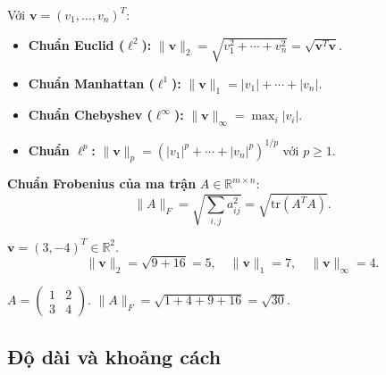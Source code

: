 \documentclass[12pt,a4paper]{article}
\begin{document}
\begin{congthuc}[title={Các chuẩn thông dụng trên $\mathbb{R}^n$}]
Với $\mathbf{v} = (v_1, \ldots, v_n)^T$:
\begin{itemize}
  \item \textbf{Chuẩn Euclid ($\ell^2$):} $\|\mathbf{v}\|_2 = \sqrt{v_1^2 + \cdots + v_n^2} = \sqrt{\mathbf{v}^T\mathbf{v}}$.
  \item \textbf{Chuẩn Manhattan ($\ell^1$):} $\|\mathbf{v}\|_1 = |v_1| + \cdots + |v_n|$.
  \item \textbf{Chuẩn Chebyshev ($\ell^\infty$):} $\|\mathbf{v}\|_\infty = \max_i |v_i|$.
  \item \textbf{Chuẩn $\ell^p$:} $\|\mathbf{v}\|_p = (|v_1|^p + \cdots + |v_n|^p)^{1/p}$ với $p \ge 1$.
\end{itemize}

\textbf{Chuẩn Frobenius của ma trận} $A \in \mathbb{R}^{m\times n}$:
\[
  \|A\|_F = \sqrt{\sum_{i,j} a_{ij}^2} = \sqrt{\mathrm{tr}(A^T A)}.
\]
\end{congthuc}

\begin{vidu}
$\mathbf{v} = (3, -4)^T \in \mathbb{R}^2$. 
\[
  \|\mathbf{v}\|_2 = \sqrt{9 + 16} = 5,\quad \|\mathbf{v}\|_1 = 7,\quad \|\mathbf{v}\|_\infty = 4.
\]

$A = \begin{pmatrix}1 & 2\\ 3 & 4\end{pmatrix}$. $\|A\|_F = \sqrt{1+4+9+16} = \sqrt{30}$.
\end{vidu}

\begin{center}
\end{center}

\subsection{Độ dài và khoảng cách}
\end{document}
